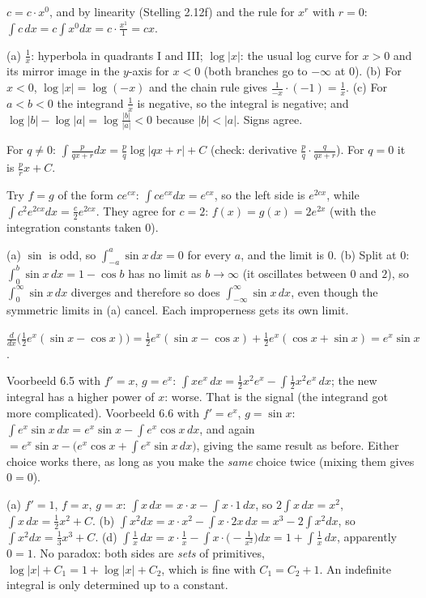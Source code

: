  $c=c\cdot x^0$, and by linearity (Stelling 2.12f) and the rule for $x^r$ with $r=0$: $\int c\,dx=c\int x^0dx=c\cdot\frac{x^1}1=cx$.

 (a) $\frac1x$: hyperbola in quadrants I and III; $\log|x|$: the usual log curve for $x>0$ and its mirror image in the $y$-axis for $x<0$ (both branches go to $-\infty$ at $0$). (b) For $x<0$, $\log|x|=\log(-x)$ and the chain rule gives $\frac1{-x}\cdot(-1)=\frac1x$. (c) For $a<b<0$ the integrand $\frac1x$ is negative, so the integral is negative; and $\log|b|-\log|a|=\log\frac{|b|}{|a|}<0$ because $|b|<|a|$. Signs agree.

 For $q\ne0$: $\int\frac p{qx+r}dx=\frac pq\log|qx+r|+C$ (check: derivative $\frac pq\cdot\frac q{qx+r}$). For $q=0$ it is $\frac prx+C$.

 Try $f=g$ of the form $ce^{cx}$: $\int ce^{cx}dx=e^{cx}$, so the left side is $e^{2cx}$, while $\int c^2e^{2cx}dx=\frac c2e^{2cx}$. They agree for $c=2$: $f(x)=g(x)=2e^{2x}$ (with the integration constants taken $0$).

 (a) $\sin$ is odd, so $\int_{-a}^a\sin x\,dx=0$ for every $a$, and the limit is $0$. (b) Split at $0$: $\int_0^b\sin x\,dx=1-\cos b$ has no limit as $b\to\infty$ (it oscillates between $0$ and $2$), so $\int_0^\infty\sin x\,dx$ diverges and therefore so does $\int_{-\infty}^\infty\sin x\,dx$, even though the symmetric limits in (a) cancel. Each improperness gets its own limit.

 $\frac d{dx}\big(\frac12e^x(\sin x-\cos x)\big)=\frac12e^x(\sin x-\cos x)+\frac12e^x(\cos x+\sin x)=e^x\sin x$. \checkmark

 Voorbeeld 6.5 with $f'=x$, $g=e^x$: $\int xe^x\,dx=\frac12x^2e^x-\int\frac12x^2e^x\,dx$; the new integral has a higher power of $x$: worse. That is the signal (the integrand got more complicated). Voorbeeld 6.6 with $f'=e^x$, $g=\sin x$: $\int e^x\sin x\,dx=e^x\sin x-\int e^x\cos x\,dx$, and again $=e^x\sin x-\big(e^x\cos x+\int e^x\sin x\,dx\big)$, giving the same result as before. Either choice works there, as long as you make the \emph{same} choice twice (mixing them gives $0=0$).

 (a) $f'=1$, $f=x$, $g=x$: $\int x\,dx=x\cdot x-\int x\cdot1\,dx$, so $2\int x\,dx=x^2$, $\int x\,dx=\frac12x^2+C$. (b) $\int x^2dx=x\cdot x^2-\int x\cdot2x\,dx=x^3-2\int x^2dx$, so $\int x^2dx=\frac13x^3+C$. (d) $\int\frac1x\,dx=x\cdot\frac1x-\int x\cdot\big(-\frac1{x^2}\big)dx=1+\int\frac1x\,dx$, apparently $0=1$. No paradox: both sides are \emph{sets} of primitives, $\log|x|+C_1=1+\log|x|+C_2$, which is fine with $C_1=C_2+1$. An indefinite integral is only determined up to a constant.

